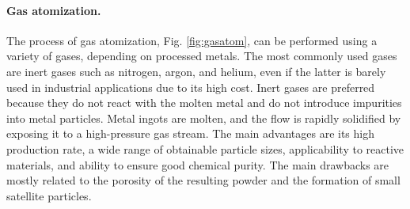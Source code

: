 \paragraph{Gas atomization.} The process of gas atomization, Fig. \ref{fig:gasatom}, can be performed using a variety of gases, depending on processed metals. The most commonly used gases are inert gases such as nitrogen, argon, and helium, even if the latter is barely used in industrial applications due to its high cost. Inert gases are preferred because they do not react with the molten metal and do not introduce impurities into metal particles. Metal ingots are molten, and the flow is rapidly solidified by exposing it to a high-pressure gas stream. The main advantages are its high production rate, a wide range of obtainable particle sizes, applicability to reactive materials, and ability to ensure good chemical purity. The main drawbacks are mostly related to the porosity of the resulting powder and the formation of small satellite particles.
